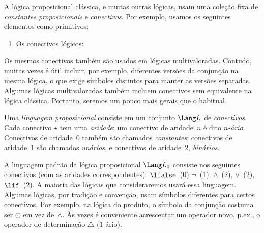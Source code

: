 \documentclass[../../../include/open-logic-section]{subfiles}
\begin{document}


A lógica proposicional clássica, e muitas outras lógicas, usam uma coleção fixa
de \emph{constantes proposicionais} e \emph{conectivos}. Por
exemplo, usamos os seguintes elementos como primitivos:
\begin{enumerate}
\item Os conectivos lógicos:
  \startycommalist
\end{enumerate}

Os mesmos conectivos também são usados em lógicas multivaloradas. Contudo,
muitas vezes é útil incluir, por exemplo, diferentes versões da conjunção
na mesma lógica, o que exige símbolos distintos para manter as
versões separadas. Algumas lógicas multivaloradas também incluem
conectivos sem equivalente na lógica clássica. Portanto, seremos um
pouco mais gerais que o habitual.

\begin{defn}
  Uma \emph{linguagem proposicional} consiste em um conjunto $\Lang L$ de
  \emph{conectivos}. Cada conectivo $\star$ tem uma \emph{aridade}; um
  conectivo de aridade~$n$ é dito \emph{$n$-ário}.
  Conectivos de aridade~$0$ também são chamados \emph{constantes};
  conectivos de aridade~$1$ são chamados \emph{unários}, e conectivos de
  aridade~$2$, \emph{binários}.
\end{defn}

\begin{ex}
  A linguagem padrão da lógica proposicional $\Lang L_0$ consiste nos
  seguintes conectivos (com as aridades correspondentes): 
  $\lfalse$~($0$)
  $\lnot$~($1$),
  $\land$~($2$),
  $\lor$~($2$),
  $\lif$~($2$). A maioria das lógicas que consideraremos usará essa linguagem. Algumas
  lógicas, por tradição e convenção, usam símbolos diferentes para certos
  conectivos. Por exemplo, na lógica do produto, o símbolo da conjunção
  costuma ser $\odot$ em vez de~$\land$. Às vezes é conveniente
  acrescentar um operador novo, p.ex., o operador de determinação $\triangle$
  ($1$-ário).
\end{ex}
\end{document}
